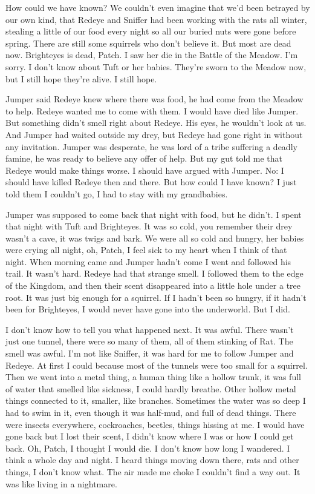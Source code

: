 \documentclass[ebook,oneside,openany,17pt]{memoir}
\newenvironment{tolerant}[1]{%
  \par\tolerance=#1\relax
}{%
  \par
}
\begin{document}
How could we have known? We couldn’t even imagine that we’d been
betrayed by our own kind, that Redeye and Sniffer had been working
with the rats all winter, stealing a little of our food every night so
all our buried nuts were gone before spring. There are still some
squirrels who don’t believe it. But most are dead now. Brighteyes is
dead, Patch. I saw her die in the Battle of the Meadow. I’m sorry. I
don’t know about Tuft or her babies. They’re sworn to the Meadow now,
but I still hope they’re alive. I still hope.

\begin{tolerant}{500}
Jumper said Redeye knew where there was food, he had come from the
Meadow to help. Redeye want\-ed me to come with them. I would have died
like Jumper. But something didn’t smell right about Redeye. His eyes,
he wouldn’t look at us. And Jumper had waited outside my drey, but
Redeye had gone right in without any invitation. Jumper was desperate,
he was lord of a tribe suffering a deadly famine, he was ready to
believe any offer of help. But my gut told me that Redeye would make
things worse. I should have argued with Jumper. No: I should have
killed Redeye then and there. But how could I have known? I just told
them I couldn’t go, I had to stay with my grandbabies.
\end{tolerant}

Jumper was supposed to come back that night with food, but he
didn’t. I spent that night with Tuft and Brighteyes. It was so cold,
you remember their drey wasn’t a cave, it was twigs and bark. We were
all so cold and hungry, her babies were crying all night, oh, Patch, I
feel sick to my heart when I think of that night. When morning came
and Jumper hadn’t come I went and followed his trail. It wasn’t
hard. Redeye had that strange smell. I followed them to the edge of
the Kingdom, and then their scent disappeared into a little hole under
a tree root. It was just big enough for a squirrel. If I hadn’t been
so hungry, if it hadn’t been for Brighteyes, I would never have gone
into the underworld. But I did.

I don’t know how to tell you what happened next. It was awful. There
wasn’t just one tunnel, there were so many of them, all of them
stinking of Rat. The smell was awful. I’m not like Sniffer, it was
hard for me to follow Jumper and Redeye. At first I could because most
of the tunnels were too small for a squirrel. Then we went into a
metal thing, a human thing like a hollow trunk, it was full of water
that smelled like sickness, I could hardly breathe. Other hollow metal
things connected to it, smaller, like branches. Sometimes the water
was so deep I had to swim in it, even though it was half-mud, and full
of dead things. There were insects everywhere, cockroaches, beetles,
things hissing at me. I would have gone back but I lost their scent, I
didn’t know where I was or how I could get back. Oh, Patch, I thought
I would die. I don’t know how long I wandered. I think a whole day and
night. I heard things moving down there, rats and other things, I
don’t know what. The air made me choke I couldn’t find a way out. It
was like living in a nightmare.
\end{document}
